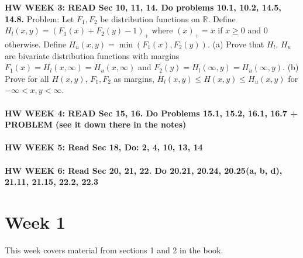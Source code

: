 \documentclass[12pt]{article}
\begin{document}
{\bf HW WEEK 3: READ Sec 10, 11, 14.  Do problems 10.1, 10.2, 14.5, 14.8.}
Problem: Let $F_1, F_2$ be distribution functions on $\mathbb{R}$.  Define $H_l(x,y) = (F_1(x) + F_2(y) - 1)_+$ where $(x)_+ = x$ if $x \ge 0$ and $0$ otherwise.  Define $H_u(x,y) = \min(F_1(x), F_2(y))$.  (a) Prove that $H_l$, $H_u$ are bivariate distribution functions with margins $F_1(x) = H_l(x, \infty) = H_u(x, \infty)$ and $F_2(y) = H_l(\infty, y) = H_u(\infty, y)$. (b) Prove for all $H(x,y)$, $F_1, F_2$ as margins, $H_l(x,y) \le H(x,y) \le H_u(x,y)$ for $-\infty < x,y < \infty$.
\\ \\
{\bf HW WEEK 4: READ Sec 15, 16.  Do Problems 15.1, 15.2, 16.1, 16.7 + PROBLEM (see it down there in the notes)}
\\ \\
{\bf HW WEEK 5: Read Sec 18, Do: 2, 4, 10, 13, 14}
\\ \\
{\bf HW WEEK 6: Read Sec 20, 21, 22.  Do 20.21, 20.24, 20.25(a, b, d), 21.11, 21.15, 22.2, 22.3}


\section{Week 1}
This week covers material from sections 1 and 2 in the book.
\end{document}
